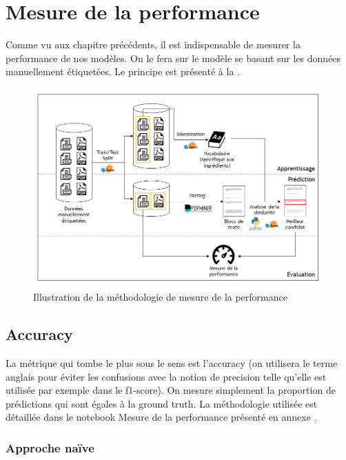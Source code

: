    \chapter{Mesure de la performance}
    
    Comme vu aux chapitre précédents, il est indispensable de mesurer la performance de nos modèles.
    On le fera sur le modèle se basant sur les données manuellement étiquetées.
    Le principe est présenté à la .

    \begin{figure}[htbp]
        \begin{center}
        \includegraphics[width=0.9\linewidth]{img/measured_model.png}
        \end{center}
        \caption{Illustration de la méthodologie de mesure de la performance}
        \label{fig:measured_model}
    \end{figure}     

        \section{Accuracy}
        
        La métrique qui tombe le plus sous le sens est l'accuracy (on utilisera le terme anglais pour éviter les confusions avec la notion de \og precision \fg telle qu'elle est utilisée par exemple dans le f1-score).
        On mesure simplement la proportion de prédictions qui sont égales à la ground truth.
        La méthodologie utilisée est détaillée dans le notebook \og Mesure de la performance \fg présenté en annexe .

            \subsection{Approche naïve}

